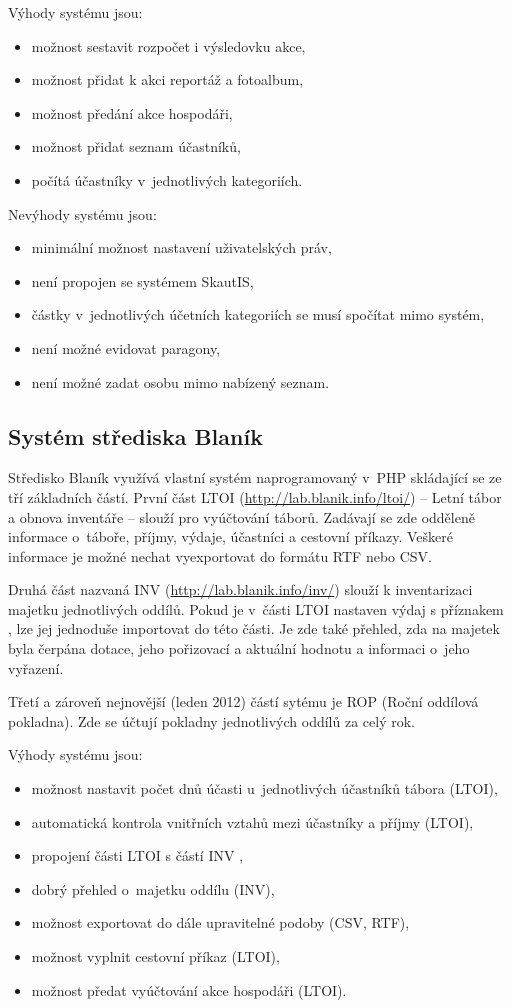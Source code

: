 \documentclass[thesis=B,czech]{FITthesis}[2011/06/14]
\begin{document}
Výhody systému jsou:
\begin{itemize}
	\item možnost sestavit rozpočet i výsledovku akce,
	\item možnost přidat k akci reportáž a fotoalbum,
	\item možnost předání akce hospodáři,
	\item možnost přidat seznam účastníků,
	\item počítá účastníky v~jednotlivých kategoriích.
\end{itemize}

Nevýhody systému jsou:
\begin{itemize}
	\item minimální možnost nastavení uživatelských práv,
	\item není propojen se systémem SkautIS,
	\item částky v~jednotlivých účetních kategoriích se musí spočítat mimo systém,
	\item není možné evidovat paragony,
	\item není možné zadat osobu mimo nabízený seznam.
\end{itemize}

\subsection{Systém střediska Blaník}
Středisko Blaník využívá vlastní systém naprogramovaný v~PHP skládající se ze tří základních částí. První část LTOI (\url{http://lab.blanik.info/ltoi/}) -- Letní tábor a obnova inventáře -- slouží pro vyúčtování táborů. Zadávají se zde odděleně informace o~táboře, příjmy, výdaje, účastníci a cestovní příkazy. Veškeré informace je možné nechat vyexportovat do formátu RTF nebo CSV.

Druhá část nazvaná INV (\url{http://lab.blanik.info/inv/}) slouží k inventarizaci majetku jednotlivých oddílů. Pokud je v~části LTOI nastaven výdaj s příznakem , lze jej jednoduše importovat do této části. Je zde také přehled, zda na majetek byla čerpána dotace, jeho pořizovací a aktuální hodnotu a informaci o~jeho vyřazení.

Třetí a zároveň nejnovější (leden 2012) částí sytému je ROP (Roční od\-dílová pokladna). Zde se účtují pokladny jednotlivých oddílů za celý rok.

Výhody systému jsou:
\begin{itemize}
	\item možnost nastavit počet dnů účasti u~jednotlivých účastníků tábora (LTOI),
	\item automatická kontrola vnitřních vztahů mezi účastníky a příjmy (LTOI),
	\item propojení části LTOI s částí INV ,
	\item dobrý přehled o~majetku oddílu (INV),
	\item možnost exportovat do dále upravitelné podoby (CSV, RTF),
	\item možnost vyplnit cestovní příkaz (LTOI),
	\item možnost předat vyúčtování akce hospodáři (LTOI).
\end{itemize}
\end{document}
